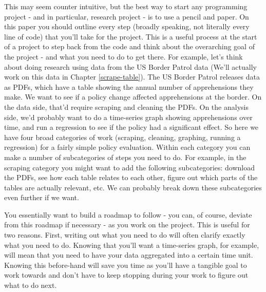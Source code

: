 \documentclass[
]{krantz}
\begin{document}
This may seem counter intuitive, but the best way to start
any programming project - and in particular, research
project - is to use a pencil and paper. On this paper you
should outline every step (broadly speaking, not literally
every line of code) that you'll take for the project. This
is a useful process at the start of a project to step back
from the code and think about the overarching goal of the
project - and what you need to do to get there. For example,
let's think about doing research using data from the US
Border Patrol data (We'll actually work on this data in
Chapter \ref{scrape-table}). The US Border Patrol releases
data as PDFs, which have a table showing the annual number
of apprehensions they make. We want to see if a policy
change affected apprehensions at the border. On the data
side, that'd require scraping and cleaning the PDFs. On the
analysis side, we'd probably want to do a time-series graph
showing apprehensions over time, and run a regression to see
if the policy had a significant effect. So here we have four
broad categories of work (scraping, cleaning, graphing,
running a regression) for a fairly simple policy evaluation.
Within each category you can make a number of subcategories
of steps you need to do. For example, in the scraping
category you might want to add the following subcategories:
download the PDFs, see how each table relates to each other,
figure out which parts of the tables are actually relevant,
etc. We can probably break down these subcategories even
further if we want.

You essentially want to build a roadmap to follow - you can,
of course, deviate from this roadmap if necessary - as you
work on the project. This is useful for two reasons. First,
writing out what you need to do will often clarify exactly
what you need to do. Knowing that you'll want a time-series
graph, for example, will mean that you need to have your
data aggregated into a certain time unit. Knowing this
before-hand will save you time as you'll have a tangible
goal to work towards and don't have to keep stopping during
your work to figure out what to do next.
\end{document}
